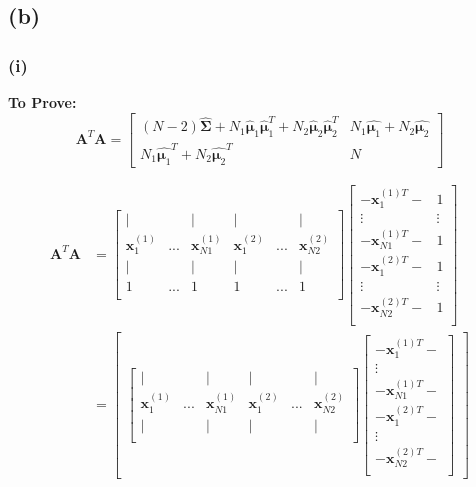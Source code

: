 \documentclass[11pt]{article}
\begin{document}
\subsection*{(b)}
\subsubsection*{(i)}
\noindent \textbf{To Prove:}
$$\pmb{A}^T\pmb{A}=\begin{bmatrix}
(N-2)\hat{\pmb{\Sigma}}+N_1\hat{\pmb{\mu}}_1\hat{\pmb{\mu}}_1^T+N_2\hat{\pmb{\mu}}_2\hat{\pmb{\mu}}_2^T & N_1\hat{\pmb{\mu}_1}+N_2\hat{\pmb{\mu}_2}\\
N_1\hat{\pmb{\mu}_1}^T+N_2\hat{\pmb{\mu}_2}^T & N
\end{bmatrix}$$

\begin{equation}
\begin{split}
\pmb{A}^T\pmb{A}&=\begin{bmatrix}
|&&|&|&&|\\
\pmb{x}^{(1)}_1&...&\pmb{x}^{(1)}_{N1}&\pmb{x}^{(2)}_1&...&\pmb{x}^{(2)}_{N2}\\
|&&|&|&&|\\
1&...&1&1&...&1\\
\end{bmatrix}\begin{bmatrix}
-\pmb{x}^{(1)T}_1-& 1\\
\vdots&\vdots\\
-\pmb{x}^{(1)T}_{N1}-& 1\\
-\pmb{x}^{(2)T}_1-& 1\\
\vdots&\vdots\\
-\pmb{x}^{(2)T}_{N2}-& 1\\
\end{bmatrix}\\
&=\begin{bmatrix}
\begin{bmatrix}
|&&|&|&&|\\
\pmb{x}^{(1)}_1&...&\pmb{x}^{(1)}_{N1}&\pmb{x}^{(2)}_1&...&\pmb{x}^{(2)}_{N2}\\
|&&|&|&&|\\
\end{bmatrix}\begin{bmatrix}
-\pmb{x}^{(1)T}_1-\\
\vdots\\
-\pmb{x}^{(1)T}_{N1}-\\
-\pmb{x}^{(2)T}_1-\\
\vdots\\
-\pmb{x}^{(2)T}_{N2}-\\

\end{bmatrix}
\end{bmatrix}
\end{split}
\end{equation}
\end{document}
